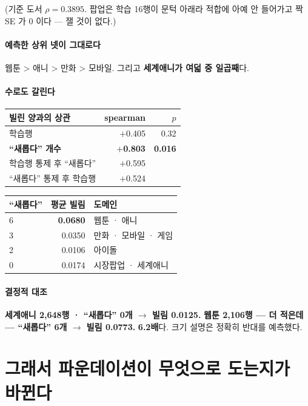 \documentclass[10pt]{article}
\begin{document}
(기준 도서 $\rho{=}0.3895$. 팝업은 학습 16행이 문턱 아래라 적합에 아예 안
들어가고 짝SE 가 0 이다 --- 잴 것이 없다.)

\paragraph{예측한 상위 넷이 그대로다} 웹툰 > 애니 > 만화 > 모바일. 그리고
\textbf{세계애니가 여덟 중 일곱째}다.

\paragraph{수로도 갈린다}

\begin{center}\small
\begin{tabular}{lrr}
\hline
빌린 양과의 상관 & spearman & $p$ \\
\hline
학습행 & $+$0.405 & 0.32 \\
\textbf{``새롭다'' 개수} & \textbf{$+$0.803} & \textbf{0.016} \\
\hline
학습행 통제 후 ``새롭다'' & $+$0.595 & \\
``새롭다'' 통제 후 학습행 & $+$0.524 & \\
\hline
\end{tabular}
\end{center}

\begin{center}\footnotesize
\begin{tabular}{lrl}
\hline
``새롭다'' & 평균 빌림 & 도메인 \\
\hline
6 & \textbf{0.0680} & 웹툰 · 애니 \\
3 & 0.0350 & 만화 · 모바일 · 게임 \\
2 & 0.0106 & 아이돌 \\
0 & 0.0174 & 시장팝업 · 세계애니 \\
\hline
\end{tabular}
\end{center}

\paragraph{결정적 대조} \textbf{세계애니 2,648행 · ``새롭다'' 0개 $\to$
빌림 0.0125.} \textbf{웹툰 2,106행 --- 더 적은데 --- ``새롭다'' 6개 $\to$
빌림 0.0773.} \textbf{6.2배}다. 크기 설명은 정확히 반대를 예측했다.

\section{그래서 파운데이션이 무엇으로 도는지가 바뀐다}
\end{document}
